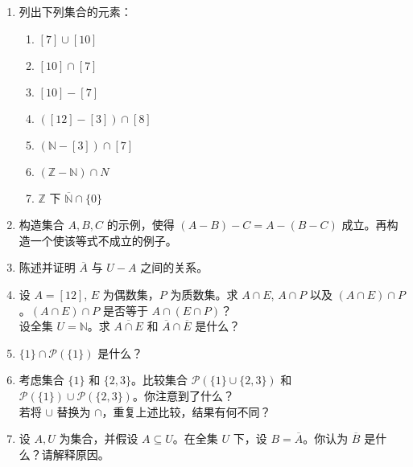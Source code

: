 \begin{enumerate}[label=(\arabic*)]
    \item 列出下列集合的元素：
        \begin{enumerate}[label=(\alph*)]
            \item $[7] \cup [10]$
            \item $[10] \cap [7]$
            \item $[10] - [7]$
            \item $([12] - [3]) \cap [8]$
            \item $(\mathbb{N} - [3]) \cap [7]$
            \item $(\mathbb{Z}-\mathbb{N}) \cap N$
            \item $\mathbb{Z}$ 下 $\overline{\mathbb{N}} \cap \{0\}$
        \end{enumerate}
    \item 构造集合 $A,B,C$ 的示例，使得 $(A - B) - C = A - (B - C)$ 成立。再构造一个使该等式不成立的例子。
    \item 陈述并证明 $\overline{A}$ 与 $U - A$ 之间的关系。
    \item 设 $A = [12]$, $E$ 为偶数集，$P$ 为质数集。求 $A \cap E$, $A \cap P$ 以及 $(A \cap E) \cap P$。$(A \cap E) \cap P$ 是否等于 $A \cap (E \cap P)$？\\
    设全集 $U = \mathbb{N}$。求 $\overline{A \cap E}$ 和 $\overline{A} \cap \overline{E}$ 是什么？
    \item $ \{1\} \cap \mathcal{P}(\{1\})$ 是什么？
    \item 考虑集合 $\{1\}$ 和 $\{2, 3\}$。比较集合 $\mathcal{P}(\{1\} \cup \{2, 3\})$ 和 $\mathcal{P}(\{1\}) \cup \mathcal{P}(\{2, 3\})$。你注意到了什么？\\
    若将 $\cup$ 替换为 $\cap$，重复上述比较，结果有何不同？\label{exc:exercises3.5.6}
    \item 设 $A, U$ 为集合，并假设 $A \subseteq U$。在全集 $U$ 下，设 $B = \overline{A}$。你认为 $\overline{B}$ 是什么？请解释原因。
\end{enumerate}
